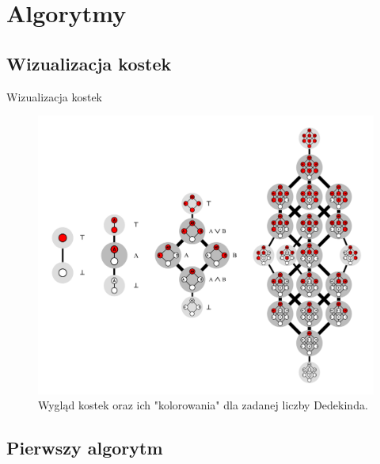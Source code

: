 \documentclass{if-beamer}
\begin{document}
\section{Algorytmy}

\subsection{Wizualizacja kostek}

\begin{frame}{Wizualizacja kostek}

\begin{figure}
\centering
\includegraphics[scale=0.15]{kostki.png}
\caption{Wygląd kostek oraz ich "kolorowania" dla zadanej liczby Dedekinda.}
\end{figure}

\end{frame}

\subsection{Pierwszy algorytm}
\end{document}
